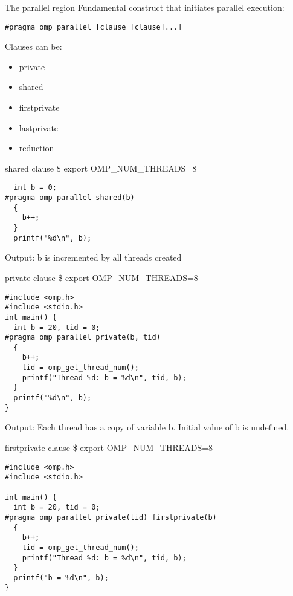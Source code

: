 \documentclass[14pt]{beamer}
\begin{document}
\begin{frame}[fragile]{The parallel region}
Fundamental construct that initiates parallel execution:
\begin{Verbatim}
#pragma omp parallel [clause [clause]...]
\end{Verbatim}
Clauses can be:
\begin{itemize}
\item private
\item shared
\item firstprivate
\item lastprivate
\item reduction
\end{itemize}
\end{frame}

\begin{frame}[fragile]{shared clause}
\$ export OMP\_NUM\_THREADS=8
\begin{Verbatim}
  int b = 0;
#pragma omp parallel shared(b)
  {
    b++;
  }
  printf("%d\n", b);
\end{Verbatim}
Output: b is incremented by all threads created
\end{frame}

\begin{frame}[fragile]{private clause}
\$ export OMP\_NUM\_THREADS=8
\begin{Verbatim}
#include <omp.h>
#include <stdio.h>
int main() {
  int b = 20, tid = 0;
#pragma omp parallel private(b, tid)
  {
    b++;
    tid = omp_get_thread_num();
    printf("Thread %d: b = %d\n", tid, b);
  }
  printf("%d\n", b);
}
\end{Verbatim}
Output: Each thread has a copy of variable b. Initial value of b is undefined.
\end{frame}

\begin{frame}[fragile]{firstprivate clause}
\$ export OMP\_NUM\_THREADS=8
\begin{Verbatim}
#include <omp.h>
#include <stdio.h>

int main() {
  int b = 20, tid = 0;
#pragma omp parallel private(tid) firstprivate(b)
  {
    b++;
    tid = omp_get_thread_num();
    printf("Thread %d: b = %d\n", tid, b);
  }
  printf("b = %d\n", b);
}
\end{Verbatim}
\end{frame}
\end{document}
